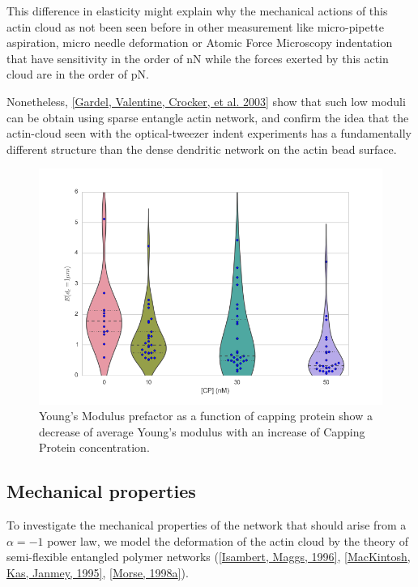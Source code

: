 \documentclass[A4paperpaper,11pt,english]{sphinxmanual}
\begin{document}
This difference in elasticity might explain why the mechanical actions of this actin cloud as not been
seen before in other measurement like micro-pipette aspiration,
micro needle deformation or Atomic Force Microscopy indentation that have
sensitivity in the order of nN while the forces exerted by this actin cloud
are in the order of pN.

Nonetheless, {\hyperref[parts/part3:gardel2003]{{[}Gardel, Valentine, Crocker,  et al.  2003{]}}} show that such low moduli can be obtain using
sparse entangle actin network, and confirm the idea that the actin-cloud seen
with the optical-tweezer indent experiments has a fundamentally different
structure than the dense dendritic network on the actin
bead surface.
\begin{figure}[htbp]
\centering
\capstart

\includegraphics[width=0.800\linewidth]{E0_violin.png}
\caption{Young's Modulus prefactor as a function of capping protein show a decrease of
average Young's modulus with an increase of Capping Protein concentration.}\label{parts/part3:ev}\end{figure}


\subsection{Mechanical properties}
\label{parts/part3:mechanical-properties}
To investigate the mechanical properties of the network that should arise from
a \(\alpha = -1\) power law, we model the deformation of the actin cloud by
the theory of semi-flexible entangled polymer networks ({\hyperref[parts/part3:isambert1996]{{[}Isambert, Maggs,  1996{]}}},
{\hyperref[parts/part3:mackintosh1995]{{[}MacKintosh, Kas, Janmey,  1995{]}}}, {\hyperref[parts/part3:morse1998a]{{[}Morse,  1998a{]}}}).
\end{document}
